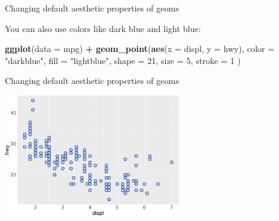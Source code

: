 \documentclass[ignorenonframetext,]{beamer}
\newenvironment{Shaded}{\begin{snugshade}}{\end{snugshade}}
\newcommand{\DataTypeTok}[1]{\textcolor[rgb]{0.13,0.29,0.53}{#1}}
\newcommand{\DecValTok}[1]{\textcolor[rgb]{0.00,0.00,0.81}{#1}}
\newcommand{\KeywordTok}[1]{\textcolor[rgb]{0.13,0.29,0.53}{\textbf{#1}}}
\newcommand{\NormalTok}[1]{#1}
\newcommand{\OperatorTok}[1]{\textcolor[rgb]{0.81,0.36,0.00}{\textbf{#1}}}
\newcommand{\StringTok}[1]{\textcolor[rgb]{0.31,0.60,0.02}{#1}}
\begin{document}
\begin{frame}[fragile]{Changing default aesthetic properties of geoms}
\protect\hypertarget{changing-default-aesthetic-properties-of-geoms-12}{}

You can also use colors like dark blue and light blue:

\begin{Shaded}
\begin{Highlighting}[]
\KeywordTok{ggplot}\NormalTok{(}\DataTypeTok{data =}\NormalTok{ mpg) }\OperatorTok{+}
\StringTok{  }\KeywordTok{geom_point}\NormalTok{(}\KeywordTok{aes}\NormalTok{(}\DataTypeTok{x =}\NormalTok{ displ, }\DataTypeTok{y =}\NormalTok{ hwy),}
    \DataTypeTok{color =} \StringTok{"darkblue"}\NormalTok{,}
    \DataTypeTok{fill =} \StringTok{"lightblue"}\NormalTok{,}
    \DataTypeTok{shape =} \DecValTok{21}\NormalTok{,}
    \DataTypeTok{size =} \DecValTok{5}\NormalTok{,}
    \DataTypeTok{stroke =} \DecValTok{1}
\NormalTok{  )}
\end{Highlighting}
\end{Shaded}

\end{frame}

\begin{frame}{Changing default aesthetic properties of geoms}
\protect\hypertarget{changing-default-aesthetic-properties-of-geoms-13}{}

\begin{center}\includegraphics[height=200px]{data-visualization_files/figure-beamer/unnamed-chunk-49-1} \end{center}

\end{frame}
\end{document}

